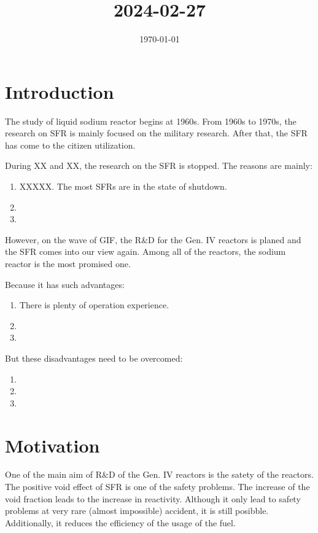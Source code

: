 \documentclass{article}
\date{\today}
\title{2024-02-27}
\begin{document}
\maketitle
\tableofcontents


\section{Introduction}
\label{sec:org09d2c4b}
The study of liquid sodium reactor begins at 1960s. From 1960s to 1970s, the research on SFR is mainly focused on the military research. After that, the SFR has come to the citizen utilization.

During XX and XX, the research on the SFR is stopped.
The reasons are mainly:
\begin{enumerate}
\item XXXXX. The most SFRs are in the state of shutdown.
\item 

\item 
\end{enumerate}

However, on the wave of GIF, the R\&D for the Gen. IV reactors is planed and the SFR comes into our view again. Among all of the reactors, the sodium reactor is the most promised one.

Because it has such advantages:
\begin{enumerate}
\item There is plenty of operation experience.
\item 

\item 
\end{enumerate}

But these disadvantages need to be overcomed:
\begin{enumerate}
\item 

\item 

\item 
\end{enumerate}

\section{Motivation}
\label{sec:orgd3e9f61}
One of the main aim of R\&D of the Gen. IV reactors is the satety of the reactors. The positive void effect of SFR is one of the safety problems. The increase of the void fraction leads to the increase in reactivity. Although it only lead to safety problems at very rare (almost impossible) accident, it is still posibble. Additionally, it reduces the efficiency of the usage of the fuel.
\end{document}

